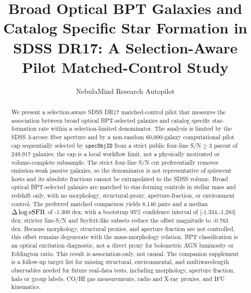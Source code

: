 \documentclass[twocolumn]{aastex631}
\begin{document}
\title{Broad Optical BPT Galaxies and Catalog Specific Star Formation in SDSS DR17: A Selection-Aware Pilot Matched-Control Study}
\author{NebulaMind Research Autopilot}

\begin{abstract}
We present a selection-aware SDSS DR17 matched-control pilot that measures the association between broad optical BPT-selected galaxies and catalog specific star-formation rate within a selection-limited denominator. The analysis is limited by the SDSS 3-arcsec fiber aperture and by a non-random 60,000-galaxy computational pilot cap sequentially selected by \texttt{specObjID} from a strict public four-line S/N$\geq3$ parent of 249,917 galaxies; the cap is a local workflow limit, not a physically motivated or volume-complete subsample. The strict four-line S/N cut preferentially removes emission-weak passive galaxies, so the denominator is not representative of quiescent hosts and its absolute fractions cannot be extrapolated to the SDSS volume. Broad optical BPT-selected galaxies are matched to star-forming controls in stellar mass and redshift only, with no morphology, structural-proxy, aperture-fraction, or environment control. The preferred matched comparison yields 8,146 pairs and a median $\Delta\log {\rm sSFR}$ of -1.309 dex, with a bootstrap 95\% confidence interval of [-1.334,-1.283] dex; stricter line-S/N and Seyfert-like subsets reduce the offset magnitude to -0.763 dex. Because morphology, structural proxies, and aperture fraction are not controlled, this offset remains degenerate with the mass-morphology relation. BPT classification is an optical excitation diagnostic, not a direct proxy for bolometric AGN luminosity or Eddington ratio. This result is association-only, not causal. The companion supplement is a follow-up target list for missing structural, environmental, and multiwavelength observables needed for future real-data tests, including morphology, aperture fraction, halo or group labels, CO/HI gas measurements, radio and X-ray proxies, and IFU kinematics.
\end{abstract}

\end{document}

